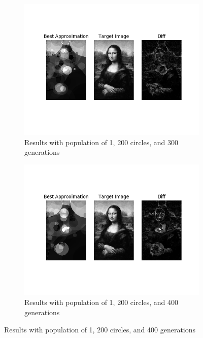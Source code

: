 \documentclass{article}
\begin{document}
\begin{figure}[H]
    \centering
    \begin{subfigure}[b]{0.45\textwidth}
        \centering
        \includegraphics[width=\textwidth]{output/bs-p1c200g300.png}
        \caption{Results with population of 1, 200 circles, and 300 generations}
    \end{subfigure}
    \begin{subfigure}[b]{0.45\textwidth}
        \centering
        \includegraphics[width=\textwidth]{output/bs-p1c200g400.png}
        \caption{Results with population of 1, 200 circles, and 400 generations}
    \end{subfigure}
\end{figure}
\end{document}
